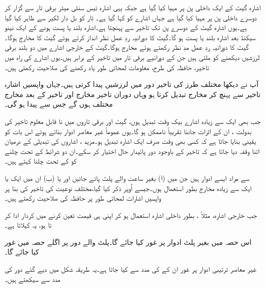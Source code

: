  اشارہ   گیٹ کے ایک داخلی پن پر مہیا کیا گیا ہے جبکہ یہی  اشارہ تیس سنٹی میٹر  برقی تار سے  گزار کر دوسرے داخلی پن پر مہیا کیا گیا ہے جہاں اشارے کو  کہا گیا ہے۔ تار کو بل دار لکیر سے ظاہر کیا گیا ہے۔یوں اشارہ  گیٹ کے  دوسرے پن تک تاخیر سے پہنچتا ہے۔اشارہ   بلند یا پست ہونے کے ایک نینو سیکنڈ بعد اشارہ   بلند یا پست ہو گا۔گیٹ کا دورانیہ ردِ عمل نظر انداز کرتے ہوئے گیٹ کا  مخارج   ہوگا۔ گیٹ کا دورانیہ ردِ عمل مدِ نظر رکھتے ہوئے مخارج   ہوگا۔گیٹ کے خارجی اشارے میں دو بلند برقی لرزشیں  دیکھنے کو ملتی ہیں جن کے دورانیے برقی تار میں تاخیر کے برابر ہیں۔یوں اشارے  کی راہ میں  تاخیر،   حافظہ کی طرح، معلومات   لمحاتی طور یاد  رکھنے کی صلاحیت رکھتی ہیں۔

آپ نے دیکھا مختلف طرز کی  تاخیر  دور میں لرزشیں پیدا  کرتی ہیں۔جہاں واپسیں اشارہ تاخیر سے پہنچ کر مخارج تبدیل کرتا ہو وہاں دوران تاخیر مخارج اور تاخیر کے بعد مخارج مختلف ہوں گے  جس سے   پیدا ہو گی۔

 جب بھی ایک سے زیادہ اشارے بیک وقت تبدیل ہوں، گیٹ اور برقی تاروں میں نا قابل  معلوم  تاخیر کی بدولت   ، ان کے اثرات جاننا   تقریباً ناممکن ہو گا۔یوں عموماً غیر معاصر ادوار بناتے ہوئے اس بات کو یقینی بنایا جاتا ہے کہ کسی بھی وقت صرف ایک  اشارہ تبدیل ہو۔مزید  ، اشاروں  کی تبدیلی کے درمیان اتنا وقفہ دیا جاتا ہے کہ تاخیر کے باوجود دور  پائیدار حال اختیار کر سکے۔ان دو شرائط کے تحت  چلنے کو   کے تحت چلنا کہتے ہیں۔

 سے مراد ایسے  ادوار ہیں جن میں  (ا) بغیر ساعت   والے پلٹ پائے جائیں اور یا   (ب) ان میں ایک یا ایک سے زیادہ مخارج بطور  استعمال ہوں۔جیسے اُوپر ذکر کیا گیا،مختلف نوعیت کی  تاخیر کی بنا پر  واپسیں اشارات لمحاتی طور پر    حافظہ کی صلاحیت رکھتے ہیں۔

جب   خارجی اشارہ، مثلاً ،   بطور داخلی اشارہ  استعمال  ہو کر  اپنی  ہی قیمت  تعین کرنے میں کردار ادا کر تا ہو،  یہ   کہلاتا ہے۔

اس حصہ میں بغیر پلٹ  ادوار پر غور کیا جائے گا۔پلٹ والے دور پر اگلے حصہ میں غور کیا جائے گا۔

غیر معاصر ترتیبی ادوار پر غور ان کے  کی مدد سے کیا جاتا ہے۔یہ طریقہ  شکل   میں دیے گئے دور کی مدد سے سیکھتے ہیں۔

